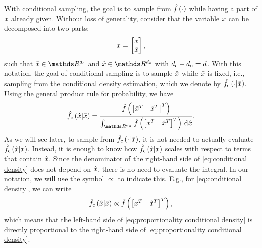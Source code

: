 With conditional sampling, the goal is to sample from $\hat{f}\left( \cdot \right)$ while having a part of $x$ already given. 
Without loss of generality, consider that the variable $x$ can be decomposed into two parts:
\begin{equation}
	\label{eq:decomposition}
	x = \begin{bmatrix}
		\bar{x} \\ \hat{x}
	\end{bmatrix},
\end{equation}
such that $\variableparta \in \realnumbers^{\dimensionparta}$ and $\variablepartb \in \realnumbers^{\dimensionpartb}$ with $d_\mathrm{c} + d_\mathrm{u} = d$.
With this notation, the goal of conditional sampling is to sample $\hat{x}$ while $\bar{x}$ is fixed, i.e., sampling from the conditional density estimation, \cstarta which we denote by $\hat{f}_{\mathrm{c}}\left( \cdot | \bar{x} \right)$.
Using the general product rule for probability, we have
\begin{equation}
	\label{eq:conditional density}
	\densityestcond{\variablepartb}{\variableparta}
	= \frac{\densityest{\begin{bmatrix}\variableparta^T & \variablepartb^T \end{bmatrix}^T}}
	{\int_{\realnumbers^{\dimensionpartb}} \densityest{\begin{bmatrix}\variableparta^T & \variablepartb^T \end{bmatrix}^T} \ud \variablepartb}.
\end{equation}
As we will see later, to sample from $\hat{f}_{\mathrm{c}}\left( \cdot | \bar{x} \right)$, it is not needed to actually evaluate $\hat{f}_{\mathrm{c}}\left( \hat{x} | \bar{x} \right)$.
Instead, it is enough to know how $\hat{f}_{\mathrm{c}}\left( \hat{x} | \bar{x} \right)$ scales with respect to terms that contain $\hat{x}$.
Since the denominator of the right-hand side of \cref{eq:conditional density} does not depend on $\hat{x}$, there is no need to evaluate the integral.
In our notation, we will use the symbol $\propto$ to indicate this.
E.g., for \cref{eq:conditional density}, we can write
\begin{equation}
	\label{eq:proportionality conditional density}
	\hat{f}_{\mathrm{c}}\left( \hat{x} | \bar{x} \right)
	\propto \hat{f}\left( \begin{bmatrix}\bar{x}^T & \hat{x}^T \end{bmatrix}^T \right),
\end{equation}
which means that the left-hand side of \cref{eq:proportionality conditional density} is directly proportional to the right-hand side of \cref{eq:proportionality conditional density}.
\cenda

